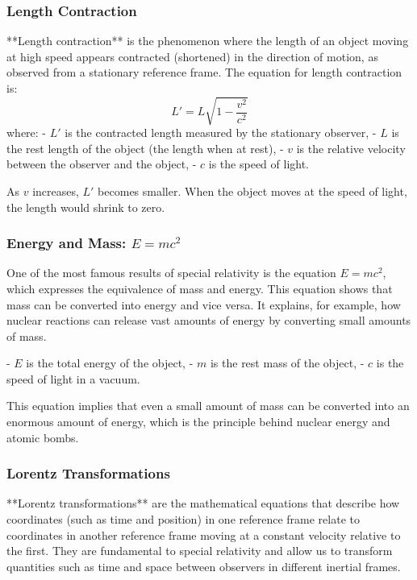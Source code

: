 \documentclass{article}
\begin{document}
\subsubsection*{Length Contraction}

**Length contraction** is the phenomenon where the length of an object moving at high speed appears contracted (shortened) in the direction of motion, as observed from a stationary reference frame. The equation for length contraction is:
\[
L' = L \sqrt{1 - \frac{v^2}{c^2}}
\]
where:
- \( L' \) is the contracted length measured by the stationary observer,
- \( L \) is the rest length of the object (the length when at rest),
- \( v \) is the relative velocity between the observer and the object,
- \( c \) is the speed of light.

As \( v \) increases, \( L' \) becomes smaller. When the object moves at the speed of light, the length would shrink to zero.

\subsubsection*{Energy and Mass: \( E = mc^2 \)}

One of the most famous results of special relativity is the equation \( E = mc^2 \), which expresses the equivalence of mass and energy. This equation shows that mass can be converted into energy and vice versa. It explains, for example, how nuclear reactions can release vast amounts of energy by converting small amounts of mass.

- \( E \) is the total energy of the object,
- \( m \) is the rest mass of the object,
- \( c \) is the speed of light in a vacuum.

This equation implies that even a small amount of mass can be converted into an enormous amount of energy, which is the principle behind nuclear energy and atomic bombs.

\subsubsection*{Lorentz Transformations}

**Lorentz transformations** are the mathematical equations that describe how coordinates (such as time and position) in one reference frame relate to coordinates in another reference frame moving at a constant velocity relative to the first. They are fundamental to special relativity and allow us to transform quantities such as time and space between observers in different inertial frames.
\end{document}
